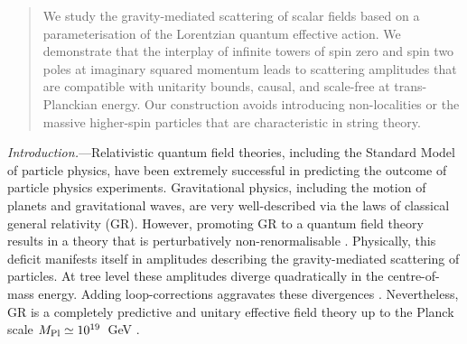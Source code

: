 \documentclass[aps,prl,onecolumn,superscriptaddress,longbibliography,nofootinbib,floatfix,showpacs,12pt]{revtex4-1}
\newcommand{\GR}{{\small GR}}
\begin{document}
\begin{abstract}
We study the gravity-mediated scattering of scalar fields based on a parameterisation of the Lorentzian quantum effective action. We demonstrate that the interplay of infinite towers of spin zero and spin two poles at imaginary squared momentum leads to scattering amplitudes that are compatible with unitarity bounds, causal, and scale-free at trans-Planckian energy. Our construction avoids introducing non-localities or the massive higher-spin particles that are characteristic in string theory. 
\end{abstract}
%

%
\maketitle


\textit{Introduction.}---Relativistic quantum field theories, including the Standard Model of particle physics, have been extremely successful in predicting the outcome of particle physics experiments.
Gravitational physics, including the motion of planets and gravitational waves, are very well-described via the laws of classical general relativity (\GR{}).
However, promoting \GR{} to a quantum field theory results in a theory that is perturbatively non-renormalisable \cite{'tHooft:1974bx, Goroff:1985sz, Goroff:1985th}.
Physically, this deficit manifests itself in amplitudes describing the gravity-mediated scattering of particles.
At tree level these amplitudes diverge quadratically in the centre-of-mass energy.
Adding loop-corrections aggravates these divergences \cite{Anber:2011ut}.
Nevertheless, \GR{} is a completely predictive and unitary effective field theory up to the Planck scale $M_{\rm Pl} \simeq 10^{19}$~GeV \cite{Donoghue:1993eb, Donoghue:1994dn,Aydemir:2012nz}.
\end{document}
